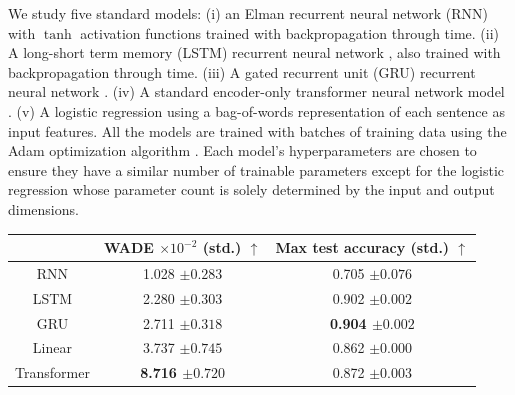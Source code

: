 {We study five standard models: (i) an Elman recurrent neural network (RNN)
\cite{elmanFindingStructureTime1990} with $\tanh$ activation functions trained
with backpropagation through time. (ii) A long-short term memory (LSTM)
recurrent neural network \cite{hochreiterLongShortTermMemory1997}, also trained
with backpropagation through time. (iii) A gated recurrent unit (GRU) recurrent
neural network \cite{choPropertiesNeuralMachine2014}. (iv) A standard
encoder-only transformer neural network model \cite{vaswaniAttentionAllYou2017}.
(v) A logistic regression using a bag-of-words representation of each sentence
as input features. All the models are trained with batches of training data
using the Adam optimization algorithm \cite{kingmaAdamMethodStochastic2015}.
Each model's hyperparameters are chosen to ensure they have a similar number of
trainable parameters except for the logistic regression whose parameter count is
solely determined by the input and output dimensions.

\begin{minipage}[htbp]{.66\linewidth}
 \vspace{21pt}
  \centering
  \begin{tabular}{c|cc}
\toprule
& \bfseries WADE $\times 10^{-2}$ (std.) $\uparrow$ & \bfseries Max test accuracy (std.) $\uparrow$ \\
\midrule
    RNN & 1.028 ${\scriptstyle \pm0.283}$ & 0.705 ${\scriptstyle \pm0.076 }$ \\
LSTM & 2.280 ${\scriptstyle \pm0.303}$ & 0.902 ${\scriptstyle \pm0.002 }$ \\
GRU & 2.711 ${\scriptstyle \pm0.318}$ & \bfseries 0.904 ${\scriptstyle \pm0.002 }$ \\
Linear & 3.737 ${\scriptstyle \pm0.745}$ & 0.862 ${\scriptstyle \pm0.000 }$ \\
Transformer & \bfseries 8.716 ${\scriptstyle \pm0.720}$ & 0.872 ${\scriptstyle \pm0.003 }$ \\


\end{tabular}
\end{minipage}}
